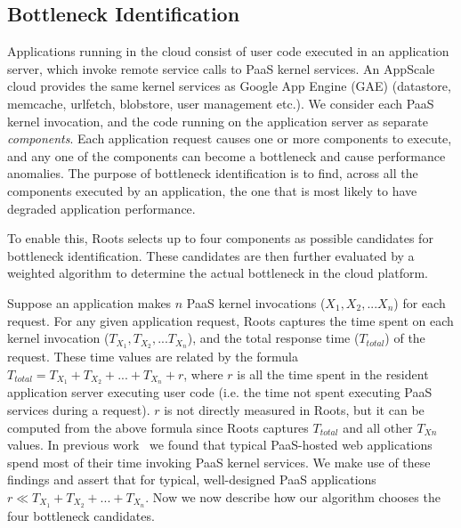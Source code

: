 \subsection{Bottleneck Identification}


Applications running in the cloud consist of user code executed in an application server, 
which invoke remote service calls to PaaS kernel services. An AppScale cloud
provides the same kernel services as Google App Engine (GAE) (datastore, memcache,
urlfetch, blobstore, user management etc.).
We consider each PaaS kernel invocation, and the code running on the application server as 
separate \textit{components}. Each application request causes one or more components to
execute, and any one of the components can become a bottleneck and cause performance anomalies.  
The purpose of bottleneck identification is to find, across all
the components executed by an application, the one that is most likely to have 
degraded application performance.

To enable this, Roots 
selects up to four components as possible candidates
for bottleneck identification. These candidates are then further evaluated by a weighted algorithm to
determine the actual bottleneck in the cloud platform.


Suppose an application makes $n$ PaaS kernel invocations ($X_1, X_2, ... X_n$) for each request. 
For any given application request,
Roots captures the time spent on each kernel invocation ($T_{X_1}, T_{X_2}, ... T_{X_n}$), and the 
total response time ($T_{total}$) of the request. These time values are related by the formula
$T_{total} = T_{X_1} + T_{X_2} + ... + T_{X_n} + r$, where $r$ is all the time spent in the resident 
application server executing user code (i.e. the time not
spent executing PaaS services during a request). $r$ is not
directly measured in Roots, but it can be computed from the above formula 
since Roots captures $T_{total}$ and all other $T_{Xn}$ values. In previous
work~\cite{Jayathilaka:2015:RTS:2806777.2806842} we found that typical
PaaS-hosted web applications spend most of their time invoking PaaS kernel services.
We make use of these findings and assert that for typical,
well-designed PaaS applications $r \ll T_{X_1} + T_{X_2} + ... + T_{X_n}$.
Now we now describe how our algorithm chooses the four bottleneck candidates.

